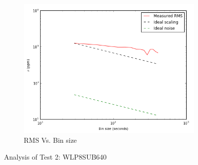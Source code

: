 \documentclass[conference]{IEEEtran}
\begin{document}
\begin{figure}[H]
    \begin{subfigure}{3}
        \includegraphics[scale=0.6]{rms_test2}
        \caption{RMS Vs. Bin size}
    \end{subfigure}
    \caption{Analysis of Test 2: WLP8SUB640}
\end{figure}
\end{document}
